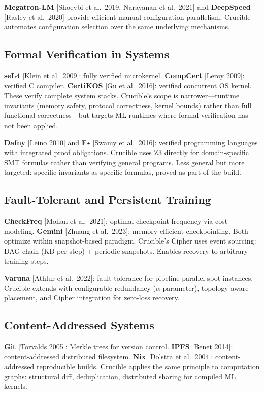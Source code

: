 \textbf{Megatron-LM} [Shoeybi et al.\ 2019, Narayanan et al.\ 2021] and \textbf{DeepSpeed} [Rasley et al.\ 2020] provide efficient manual-configuration parallelism.
Crucible automates configuration selection over the same underlying mechanisms.

\subsection{Formal Verification in Systems}

\textbf{seL4} [Klein et al.\ 2009]: fully verified microkernel.
\textbf{CompCert} [Leroy 2009]: verified C compiler.
\textbf{CertiKOS} [Gu et al.\ 2016]: verified concurrent OS kernel.
These verify complete system stacks.
Crucible's scope is narrower---runtime invariants (memory safety, protocol correctness, kernel bounds) rather than full functional correctness---but targets ML runtimes where formal verification has not been applied.

\textbf{Dafny} [Leino 2010] and \textbf{F$\star$} [Swamy et al.\ 2016]: verified programming languages with integrated proof obligations.
Crucible uses Z3 directly for domain-specific SMT formulas rather than verifying general programs.
Less general but more targeted: specific invariants as specific formulas, proved as part of the build.

\subsection{Fault-Tolerant and Persistent Training}

\textbf{CheckFreq} [Mohan et al.\ 2021]: optimal checkpoint frequency via cost modeling.
\textbf{Gemini} [Zhuang et al.\ 2023]: memory-efficient checkpointing.
Both optimize within snapshot-based paradigm.
Crucible's Cipher uses event sourcing: DAG chain (KB per step) + periodic snapshots.
Enables recovery to arbitrary training steps.

\textbf{Varuna} [Athlur et al.\ 2022]: fault tolerance for pipeline-parallel spot instances.
Crucible extends with configurable redundancy ($\alpha$ parameter), topology-aware placement, and Cipher integration for zero-loss recovery.

\subsection{Content-Addressed Systems}

\textbf{Git} [Torvalds 2005]: Merkle trees for version control.
\textbf{IPFS} [Benet 2014]: content-addressed distributed filesystem.
\textbf{Nix} [Dolstra et al.\ 2004]: content-addressed reproducible builds.
Crucible applies the same principle to computation graphs: structural diff, deduplication, distributed sharing for compiled ML kernels.
